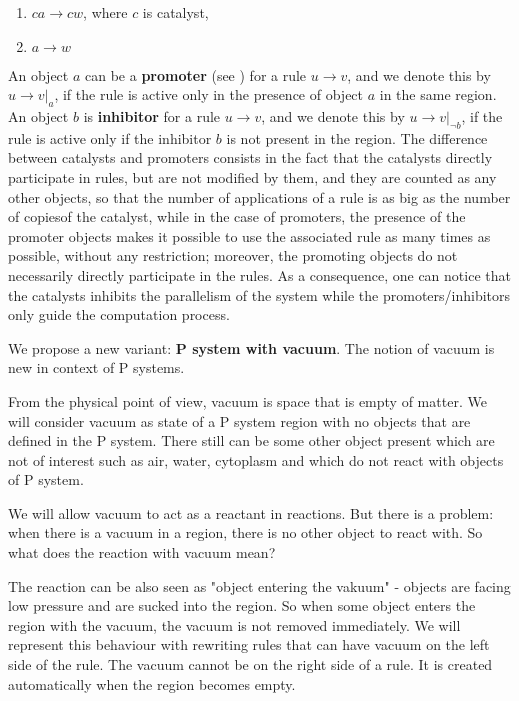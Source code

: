 \documentclass[a4paper,10pt]{article}
\begin{document}
\begin{enumerate}
	\item $ca\rightarrow cw$, where $c$ is catalyst,
	\item $a\rightarrow w$
\end{enumerate}

An object $a$ can be a {\bf promoter} (see \cite{Ionescu:jucs_10_5:on_p_systems_with}) for a rule $u\rightarrow v$, and we denote this by $u\rightarrow v|_a$, if the rule is active only in the presence of object $a$ in the same region. An object $b$ is {\bf inhibitor} for a rule $u\rightarrow v$, and we denote this by $u\rightarrow v|_{\neg b}$, if the rule is active only if the inhibitor $b$ is not present in the region.
The difference between catalysts and promoters consists in the fact that the catalysts directly participate in rules, but are not modified by them, and they are counted as any other objects, so that the number of applications of a rule is as big as the number of copiesof the catalyst, while in the case of promoters, the presence of the promoter objects makes it possible to use the associated rule as many times as possible, without any restriction; moreover, the promoting objects do not necessarily directly participate in the rules. As a consequence, one can notice that the catalysts inhibits the parallelism of the system while the promoters/inhibitors only guide the computation process.

\vspace*{\baselineskip}

We propose a new variant: {\bf P system with vacuum}. The notion of vacuum is new in context of P systems.

From the physical point of view, vacuum is space that is empty of matter. We will consider vacuum as state of a P system region with no objects that are defined in the P system. There still can be some other object present which are not of interest such as air, water, cytoplasm and which do not react with objects of P system.

We will allow vacuum to act as a reactant in reactions. But there is a problem: when there is a vacuum in a region, there is no other object to react with. So what does the reaction with vacuum mean?

The reaction can be also seen as "object entering the vakuum" - objects are facing low pressure and are sucked into the region. So when some object enters the region with the vacuum, the vacuum is not removed immediately. We will represent this behaviour with rewriting rules that can have vacuum on the left side of the rule. The vacuum cannot be on the right side of a rule. It is created automatically when the region becomes empty.
\end{document}
